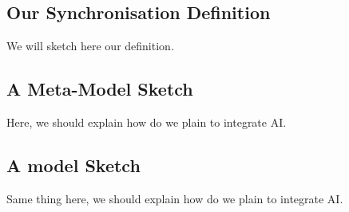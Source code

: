 

\subsection{Our Synchronisation Definition}

We will sketch here our definition. 


\subsection{A Meta-Model Sketch}
Here, we should explain how do we plain to integrate AI. 


\subsection{A model Sketch}
Same thing here, we should explain how do we plain to integrate AI. 